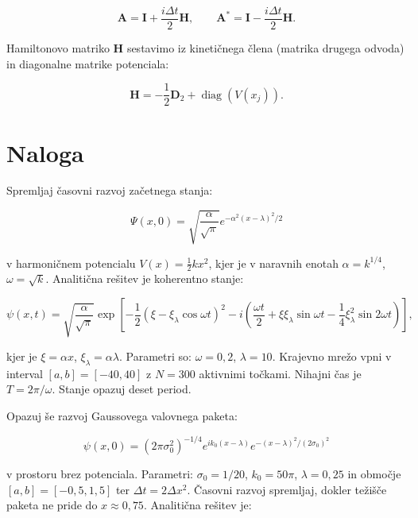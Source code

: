 \documentclass[12pt,a4paper]{article}
\begin{document}
\begin{equation}
\mathbf{A} = \mathbf{I} + \frac{i\Delta t}{2}\mathbf{H}, \qquad \mathbf{A}^* = \mathbf{I} - \frac{i\Delta t}{2}\mathbf{H}.
\end{equation}

Hamiltonovo matriko $\mathbf{H}$ sestavimo iz kinetičnega člena (matrika drugega odvoda) in diagonalne matrike potenciala:

\begin{equation}
\mathbf{H} = -\frac{1}{2} \mathbf{D}_2 + \operatorname{diag}(V(x_j)).
\end{equation}

\section{Naloga}

Spremljaj časovni razvoj začetnega stanja:

\begin{equation}
\Psi(x, 0) = \sqrt{\frac{\alpha}{\sqrt{\pi}}} e^{-\alpha^2(x-\lambda)^2/2}
\end{equation}

v harmoničnem potencialu $V(x) = \frac{1}{2}kx^2$, kjer je v naravnih enotah $\alpha = k^{1/4}$, $\omega = \sqrt{k}$. Analitična rešitev je koherentno stanje:

\begin{equation}
\psi(x, t) = \sqrt{\frac{\alpha}{\sqrt{\pi}}} \exp\left[-\frac{1}{2}(\xi - \xi_{\lambda} \cos \omega t)^2 - i\left(\frac{\omega t}{2} + \xi \xi_{\lambda} \sin \omega t - \frac{1}{4} \xi_{\lambda}^2 \sin 2\omega t\right)\right],
\end{equation}

kjer je $\xi = \alpha x$, $\xi_{\lambda} = \alpha \lambda$. Parametri so: $\omega = 0,2$, $\lambda = 10$. Krajevno mrežo vpni v interval $[a, b] = [-40, 40]$ z $N = 300$ aktivnimi točkami. Nihajni čas je $T = 2\pi/\omega$. Stanje opazuj deset period.

Opazuj še razvoj Gaussovega valovnega paketa:

\begin{equation}
\psi(x, 0) = (2\pi\sigma_0^2)^{-1/4} e^{ik_0(x-\lambda)} e^{-(x-\lambda)^2/(2\sigma_0)^2}
\end{equation}

v prostoru brez potenciala. Parametri: $\sigma_0 = 1/20$, $k_0 = 50\pi$, $\lambda = 0,25$ in območje $[a, b] = [-0,5, 1,5]$ ter $\Delta t = 2\Delta x^2$. Časovni razvoj spremljaj, dokler težišče paketa ne pride do $x \approx 0,75$. Analitična rešitev je:
\end{document}
